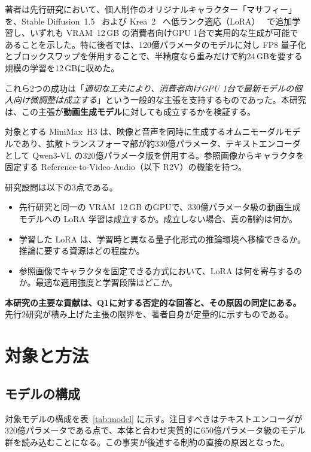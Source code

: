 \documentclass[10pt,twocolumn]{ltjsarticle}
\begin{document}
著者は先行研究において、個人制作のオリジナルキャラクター「マサフィー」を、Stable Diffusion~1.5~\cite{suzuki2026sd15lora} および Krea~2~\cite{suzuki2026krea2lora} へ低ランク適応（LoRA）~\cite{hu2022lora} で追加学習し、いずれも VRAM~12\,GB の消費者向けGPU 1台で実用的な生成が可能であることを示した。特に後者では、120億パラメータのモデルに対し FP8 量子化とブロックスワップを併用することで、半精度なら重みだけで約24\,GBを要する規模の学習を12\,GBに収めた。

これら2つの成功は「\emph{適切な工夫により、消費者向けGPU 1台で最新モデルの個人向け微調整は成立する}」という一般的な主張を支持するものであった。本研究は、この主張が\textbf{動画生成モデル}に対しても成立するかを検証する。

対象とする MiniMax~H3 は、映像と音声を同時に生成するオムニモーダルモデルであり、拡散トランスフォーマ部が約330億パラメータ、テキストエンコーダとして Qwen3-VL の320億パラメータ版を併用する。参照画像からキャラクタを固定する Reference-to-Video-Audio（以下 R2V）の機能を持つ。

研究設問は以下の3点である。

\begin{itemize}[leftmargin=2.2em,topsep=2pt,itemsep=1pt]
  \item[\textbf{Q1.}] 先行研究と同一の VRAM~12\,GB のGPUで、330億パラメータ級の動画生成モデルへの LoRA 学習は成立するか。成立しない場合、真の制約は何か。
  \item[\textbf{Q2.}] 学習した LoRA は、学習時と異なる量子化形式の推論環境へ移植できるか。推論に要する資源はどの程度か。
  \item[\textbf{Q3.}] 参照画像でキャラクタを固定できる方式において、LoRA は何を寄与するのか。最適な適用強度と学習段階はどこか。
\end{itemize}

\textbf{本研究の主要な貢献は、Q1に対する否定的な回答と、その原因の同定にある。} 先行2研究が積み上げた主張の限界を、著者自身が定量的に示すものである。

\section{対象と方法}

\subsection{モデルの構成}

対象モデルの構成を表~\ref{tab:model} に示す。注目すべきはテキストエンコーダが320億パラメータである点で、本体と合わせ実質的に650億パラメータ級のモデル群を読み込むことになる。この事実が後述する制約の直接の原因となった。
\end{document}
